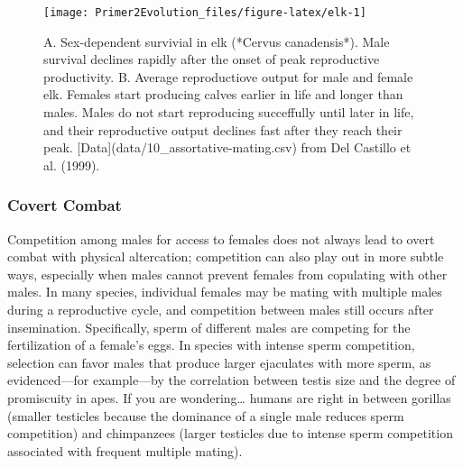 \documentclass[
]{book}
\begin{document}
\begin{figure}
\texttt{[image: Primer2Evolution\_files/figure-latex/elk-1]} \caption{A. Sex-dependent survivial in elk (*Cervus canadensis*). Male survival declines rapidly after the onset of peak reproductive productivity. B. Average reproductiove output for male and female elk. Females start producing calves earlier in life and longer than males. Males do not start reproducing succeffully until later in life, and their reproductive output declines fast after they reach their peak. [Data](data/10_assortative-mating.csv) from Del Castillo et al. (1999).}\label{fig:elk}
\end{figure}

\hypertarget{covert-combat}{%
\subsubsection*{Covert Combat}\label{covert-combat}}

Competition among males for access to females does not always lead to overt combat with physical altercation; competition can also play out in more subtle ways, especially when males cannot prevent females from copulating with other males. In many species, individual females may be mating with multiple males during a reproductive cycle, and competition between males still occurs after insemination. Specifically, sperm of different males are competing for the fertilization of a female's eggs. In species with intense sperm competition, selection can favor males that produce larger ejaculates with more sperm, as evidenced---for example---by the correlation between testis size and the degree of promiscuity in apes. If you are wondering\ldots{} humans are right in between gorillas (smaller testicles because the dominance of a single male reduces sperm competition) and chimpanzees (larger testicles due to intense sperm competition associated with frequent multiple mating).
\end{document}
